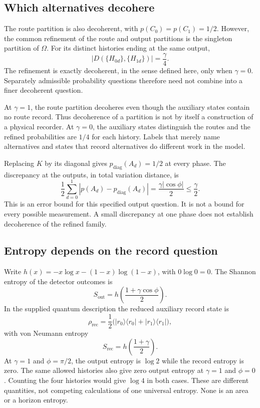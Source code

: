\subsection{Which alternatives decohere}

The route partition is also decoherent, with $p(C_0)=p(C_1)=1/2$.
However, the common refinement of the route and output partitions is the
singleton partition of $\Omega$. For its distinct histories ending at the
same output,
\[
  \left|D(\{H_{0d}\},\{H_{1d}\})\right|=\frac{\gamma}{4}.
\]
The refinement is exactly decoherent, in the sense defined here, only
when $\gamma=0$. Separately admissible probability questions therefore
need not combine into a finer decoherent question.

At $\gamma=1$, the route partition decoheres even though the auxiliary
states contain no route record. Thus decoherence of a partition is not by
itself a construction of a physical recorder. At $\gamma=0$, the auxiliary
states distinguish the routes and the refined probabilities are $1/4$
for each history. Labels that merely name alternatives and states that
record alternatives do different work in the model.

Replacing $K$ by its diagonal gives $p_{\mathrm{diag}}(A_d)=1/2$ at every
phase. The discrepancy at the outputs, in total variation distance, is
\begin{equation}
  \frac12\sum_{d=0}^1
    |p(A_d)-p_{\mathrm{diag}}(A_d)|
    =\frac{\gamma|\cos\phi|}{2}\leq\frac{\gamma}{2}.
  \label{eq:classicalerror}
\end{equation}
This is an error bound for this specified output question. It is not a
bound for every possible measurement. A small discrepancy at one phase
does not establish decoherence of the refined family.

\subsection{Entropy depends on the record question}

Write $h(x)=-x\log x-(1-x)\log(1-x)$, with $0\log0=0$. The Shannon
entropy of the detector outcomes is
\[
  S_{\mathrm{out}}=h\!\left(\frac{1+\gamma\cos\phi}{2}\right).
\]
In the supplied quantum description the reduced auxiliary record state is
\[
  \rho_{\mathrm{rec}}
    =\frac12\bigl(|r_0\rangle\langle r_0|
                 +|r_1\rangle\langle r_1|\bigr),
\]
with von Neumann entropy
\[
  S_{\mathrm{rec}}=h\!\left(\frac{1+\gamma}{2}\right).
\]
At $\gamma=1$ and $\phi=\pi/2$, the output entropy is $\log2$ while the
record entropy is zero. The same allowed histories also give zero output
entropy at $\gamma=1$ and $\phi=0$. Counting the four histories would give
$\log4$ in both cases. These are different quantities, not competing
calculations of one universal entropy. None is an area or a horizon entropy.

